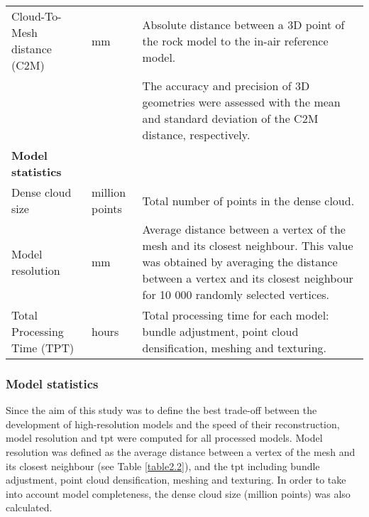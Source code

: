 \begin{table}[H]
{\begin{tabular}{L{4cm} L{1cm}L{10cm}}
Cloud-To-Mesh distance (C2M)                           & mm             & Absolute distance between a 3D point of the rock model to the in-air reference model.                                                                                                                                                                                                       \\
                                                       &                & The accuracy and precision of 3D geometries were assessed with the mean and standard deviation of the C2M distance, respectively.                                                                                                                                                           \\
\textbf{Model statistics}                              &                &                                                                                                                                                                                                                                                                                             \\
Dense cloud size                                       & million points & Total number of points in the dense cloud.                                                                                                                                                                                                                                                  \\
Model resolution                                       & mm             & Average distance between a vertex of the mesh and its closest neighbour. This value was obtained by averaging the distance between a vertex and its closest neighbour for 10 000 randomly selected vertices.                                                                                \\
Total Processing Time (TPT)                            & hours          & Total processing time for each model: bundle adjustment, point cloud densification, meshing and texturing.\\                                                       \bottomrule
\end{tabular}
    }
\end{table}

\subsubsection{Model statistics}\label{chapitre2_2.3.2}
Since the aim of this study was to define the best trade-off between the development of high-resolution models and the speed of their reconstruction, model resolution and \gls{tpt} were computed for all processed models. Model resolution was defined as the average distance between a vertex of the mesh and its closest neighbour (see Table \ref{table2.2}), and the \acrshort{tpt} including bundle adjustment, point cloud densification, meshing and texturing. In order to take into account model completeness, the dense cloud size (million points) was also calculated.

